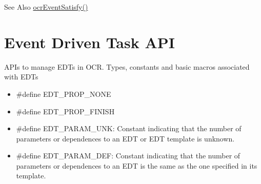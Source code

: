 \begin{DoxySeeAlso}{See Also}
\hyperlink{group__OCREvents_gab27ef5d905c01ba534e86f8e7e91eaf0}{ocr\-Event\-Satisfy()}
\end{DoxySeeAlso}



\hypertarget{group__OCREDT}{\section{Event Driven Task A\-P\-I}
\label{group__OCREDT}
}


A\-P\-Is to manage E\-D\-Ts in O\-C\-R.
Types, constants and basic macros associated with EDTs
\begin{itemize}
\item \#define EDT\_PROP\_NONE
\item \#define EDT\_PROP\_FINISH
\item \#define EDT\_PARAM\_UNK: Constant indicating that the number of parameters or dependences to an EDT or EDT template is
unknown.
\item \#define EDT\_PARAM\_DEF: Constant indicating that the number of parameters or dependences to an EDT is the same as the one
specified in its template.
\end{itemize}

